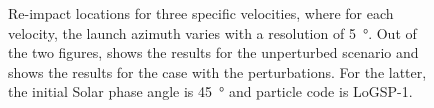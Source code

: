 \begin{figure}[htb]
\caption{Re-impact locations for three specific velocities, where for each velocity, the launch azimuth varies with a resolution of \SI{5}{\degree}. Out of the two figures, \protect{} shows the results for the unperturbed scenario and \protect{} shows the results for the case with the perturbations. For the latter, the initial Solar phase angle is \SI{45}{\degree} and particle code is LoGSP-1.}
\label{fig:specific_velocity_crashMap_noSP_spanalysis}
\end{figure}
\FloatBarrier
